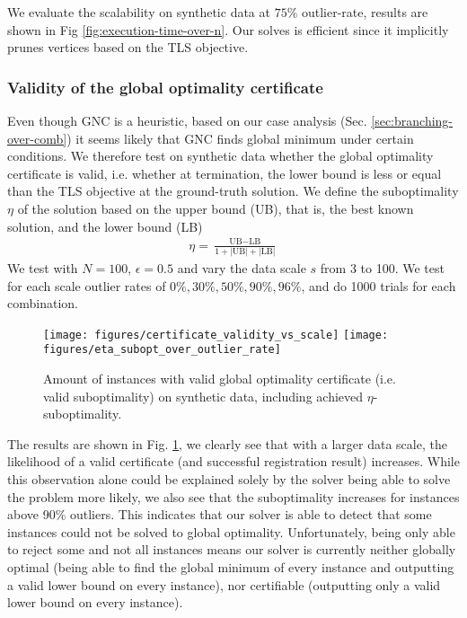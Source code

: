 We evaluate the scalability on synthetic data at $75\%$ outlier-rate, results are shown in Fig \ref{fig:execution-time-over-n}. Our solves is efficient since it implicitly prunes vertices based on the TLS objective.

\subsubsection{Validity of the global optimality certificate}
Even though GNC is a heuristic, based on our case analysis (Sec. \ref{sec:branching-over-comb}) it seems likely that GNC finds global minimum under certain conditions.
We therefore test on synthetic data whether the global optimality certificate is valid, i.e. whether at termination, the lower bound is less or equal than the TLS objective at the ground-truth solution.
We define the suboptimality $\eta$ of the solution based on the upper bound (UB), that is, the best known solution, and the lower bound (LB) \cite{9785843}
\begin{equation}
	\begin{aligned}    
		\eta = \frac{\text{UB} - \text{LB}}{1 + |\text{UB}| + |\text{LB}|}
	\end{aligned}
\end{equation}
We test with $N=100$, $\epsilon=0.5$ and vary the data scale $s$ from 3 to 100. We test for each scale outlier rates of $0\%, 30\%, 50\%, 90\%, 96\%$, and do 1000 trials for each combination.
\begin{figure}[!ht]
	\centering
	\texttt{[image: figures/certificate\_validity\_vs\_scale]}
	\texttt{[image: figures/eta\_subopt\_over\_outlier\_rate]}
	\caption{Amount of instances with valid global optimality certificate (i.e. valid suboptimality) on synthetic data, including achieved $\eta$-suboptimality.}
	\label{fig:cert-validity}
\end{figure}
The results are shown in Fig. \ref{fig:cert-validity}, we clearly see that with a larger data scale, the likelihood of a valid certificate (and successful registration result) increases. While this observation alone could be explained solely by the solver being able to solve the problem more likely, we also see that the suboptimality increases for instances above 90\% outliers. This indicates that our solver is able to detect that some instances could not be solved to global optimality.
Unfortunately, being only able to reject some and not all instances means our solver is currently neither globally optimal (being able to find the global minimum of every instance and outputting a valid lower bound on every instance), nor certifiable (outputting only a valid lower bound on every instance).


